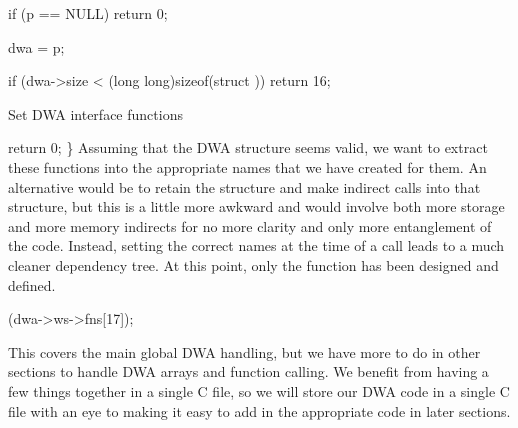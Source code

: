\documentclass{article}%
\begin{document}
        if (p == NULL)
                return 0;

        dwa = p;

        if (dwa->size < (long long)sizeof(struct ))
                return 16;

        \LA{}Set DWA interface functions~{\nwtagstyle{}}\RA{}

        return 0;
\}
\eatline
{}\nwendcode{}\nwdocspar
Assuming that the DWA structure seems valid,
we want to extract these functions into the appropriate
names that we have created for them.
An alternative would be to retain the structure
and make indirect calls into that structure,
but this is a little more awkward and would involve
both more storage and more memory indirects
for no more clarity and only more entanglement of the code.
Instead, setting the correct names at the time
of a {\Tt{}\nwendquote} call leads to a much cleaner dependency tree.
At this point, only the {\Tt{}\nwendquote} function
has been designed and defined.

\nwenddocs{}\endmoddef\nwstartdeflinemarkup{}\nwenddeflinemarkup
{}(dwa->ws->fns[17]);
\nwendcode{}\nwdocspar

This covers the main global DWA handling, 
but we have more to do in other sections 
to handle DWA arrays and function calling.
We benefit from having a few things together in a single C file,
so we will store our DWA code in a single C file
with an eye to making it easy to add in the appropriate code
in later sections.
\end{document}
